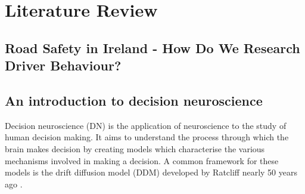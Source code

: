 \chapter{Literature Review}



\section{Road Safety in Ireland - How Do We Research Driver Behaviour?}



\section{An introduction to decision neuroscience}
Decision neuroscience (DN) is the application of neuroscience to the study of human decision making. It aims to understand the process through which the brain makes decision by creating models which characterise the various mechanisms involved in making a decision. A common framework for these models is the drift diffusion model (DDM) developed by Ratcliff nearly 50 years ago \cite{ratcliffTheoryMemoryRetrieval1978}.


